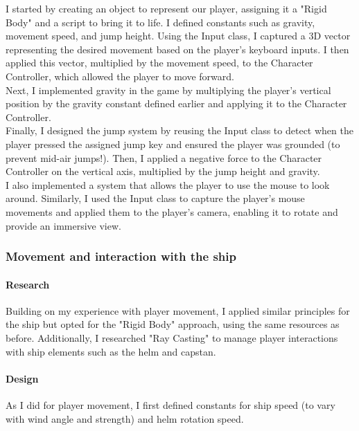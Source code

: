 \documentclass{article}
\begin{document}
I started by creating an object to represent our player, assigning it a "Rigid Body" and a script to bring it to life. I defined constants such as gravity, movement speed, and jump height. Using the Input class, I captured a 3D vector representing the desired movement based on the player's keyboard inputs. I then applied this vector, multiplied by the movement speed, to the Character Controller, which allowed the player to move forward.\\

Next, I implemented gravity in the game by multiplying the player’s vertical position by the gravity constant defined earlier and applying it to the Character Controller.\\

Finally, I designed the jump system by reusing the Input class to detect when the player pressed the assigned jump key and ensured the player was grounded (to prevent mid-air jumps!). Then, I applied a negative force to the Character Controller on the vertical axis, multiplied by the jump height and gravity.\\

I also implemented a system that allows the player to use the mouse to look around. Similarly, I used the Input class to capture the player's mouse movements and applied them to the player's camera, enabling it to rotate and provide an immersive view.

\subsubsection{Movement and interaction with the ship}
\paragraph{Research}\hfill

Building on my experience with player movement, I applied similar principles for the ship but opted for the "Rigid Body" approach, using the same resources as before. Additionally, I researched "Ray Casting" to manage player interactions with ship elements such as the helm and capstan.

\paragraph{Design}\hfill

As I did for player movement, I first defined constants for ship speed (to vary with wind angle and strength) and helm rotation speed.\\
\end{document}
